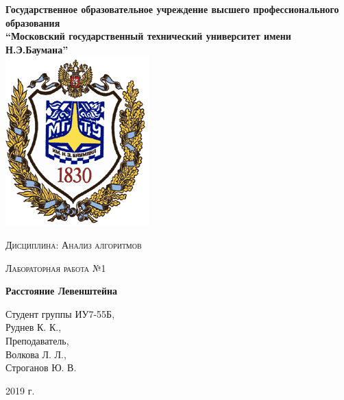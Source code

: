 \documentclass[a4paper,12pt]{report}
\begin{document}
    \begin{titlepage}

        \begin{center}
            \large
            \textbf{Государственное образовательное учреждение высшего профессионального образования\\
            “Московский государственный технический университет имени Н.Э.Баумана”\\}
            \includegraphics{bmstu-logo.png}
			\vspace{1cm}
            
            \textsc{Дисциплина: Анализ алгоритмов}
            \vspace{0.5cm}
                
            \textsc{Лабораторная работа №1}
            \vspace{1cm}
            
            {\LARGE \textbf{Расстояние Левенштейна}}
            \vspace{3cm}
                    
            \begin{flushright}
            	Студент группы ИУ7-55Б,\\   
            	Руднев К. К.,\\
            	\vspace{0.5cm}
            	Преподаватель,\\
            	Волкова Л. Л.,\\
            	Строганов Ю. В.
            	
            \end{flushright}
            \vfill
            
            2019 г.
            
            \end{center}

    \end{titlepage}
\end{document}
